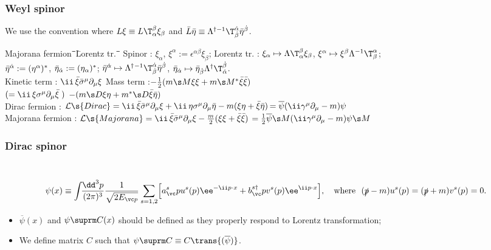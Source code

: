 \subsubsection{Weyl spinor}
We use the convention where $L\xi\equiv L\T_\alpha^\beta\xi_\beta$ and $\bar L\bar \eta\equiv \Lambda^{\dagger-1}\T^\dalpha_\dbeta\bar\eta^\dbeta$.
\begin{tabbing}
Majorana fermion~\=\hspace{1em}\=\hspace{6em}\=\hspace{8em}\=Lorentz tr.~\=\hspace{1em}\=\hspace{8.3em}\=\hspace{8em}\kill
Spinor           \>:\> $\xi_\alpha$,
                    \> $  \xi^\alpha:=\epsilon^{\alpha\beta}\xi_\beta$; \>
Lorentz tr.      \>:\> $\xi_\alpha \mapsto \Lambda\T_\alpha^\beta\xi_\beta$,
                    \> $\xi^\alpha \mapsto \xi^\beta \Lambda^{-1}\T_\beta^\alpha$;
\\
                 \> \> $\bar\eta^{\dot\alpha} :=(\eta^\alpha)^*$,
                    \> $\bar\eta_{\dot\alpha} :=(\eta_\alpha)^*$;  \> 
                 \> \> $\bar\eta^\dalpha \mapsto \Lambda^\dagger{}^{-1}\T^\dalpha_\dbeta\bar\eta^\dbeta$,
                    \> $\bar\eta_\dalpha \mapsto \bar\eta_\dbeta\Lambda^\dagger\T^\dbeta_\dalpha$.\\
Kinetic term     \>:\> $\ii\,\bar\xi\bSm\Pm\xi$ \>\>
Mass term        \>:\> [Majorana] $-\frac12(m\s M\xi\xi+m\s M^*\bar\xi\bar\xi)$\\
                 \> \> \quad $(=\ii\,\xi\Sm\Pm\bar\xi\;)$
                 \>\>\>\>[Dirac]    $-(m\s D\xi\eta+m^*\s D\bar\xi\bar\eta)$\\

Dirac fermion    \>:\> $\Lag\s{Dirac}= \ii\,\bar\xi\bSm\Pm\xi + \ii\,\eta\Sm\Pm\bar\eta
                               -m(\xi\eta+\bar\xi\bar\eta) $\>\>\>$= \overline\psi(\ii\Gm\Pm-m)\psi$\\
Majorana fermion \>:\> $\Lag\s{Majorana}= \ii\,\bar\xi\bSm\Pm\xi -\frac m2(\xi\xi+\bar\xi\bar\xi)$
                        \>\>\>$ =\frac12\overline\psi\s M(\ii\Gm\Pm-m)\psi\s M$
\end{tabbing}

\vspace{-2em}

\subsubsection{Dirac spinor}\mbox{}\\[-4em]
$$
\psi(x)\equiv\intdP{p} \frac{1}{\sqrt{2E_{\vc p}}}
               \sum_{s=1,2}\Bigl[a^s_\vc p u^s(p)\ee^{-\ii p\cdot x}
                + b^{s\dagger}_\vc p v^s(p)\ee^{\ii p\cdot x}\Bigr],\quad
       \text{where}~~ (\slashed p-m)u^s(p)=(\slashed p+m)v^s(p)=0.$$
\begin{itemize}
 \item $\overline\psi(x)$ and $\psi\suprm C(x)$ should be defined as they properly respond to Lorentz transformation;
 \item We define matrix $C$ such that $\psi\suprm C\equiv C\trans{(\overline\psi)}$.
\end{itemize}



